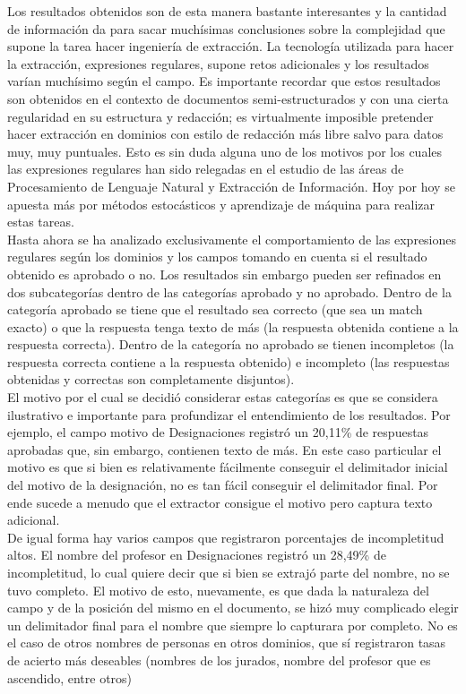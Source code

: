 Los resultados obtenidos son de esta manera bastante interesantes y la cantidad de información da para sacar muchísimas conclusiones sobre la complejidad que supone la tarea hacer ingeniería de extracción. La tecnología utilizada para hacer la extracción, expresiones regulares, supone retos adicionales y los resultados varían muchísimo según el campo. Es importante recordar que estos resultados son obtenidos en el contexto de documentos semi-estructurados y con una cierta regularidad en su estructura y redacción; es virtualmente imposible pretender hacer extracción en dominios con estilo de redacción más libre salvo para datos muy, muy puntuales. Esto es sin duda alguna uno de los motivos por los cuales las expresiones regulares han sido relegadas en el estudio de las áreas de Procesamiento de Lenguaje Natural y Extracción de Información. Hoy por hoy se apuesta más por métodos estocásticos y aprendizaje de máquina para realizar estas tareas. \\

Hasta ahora se ha analizado exclusivamente el comportamiento de las expresiones regulares según los dominios y los campos tomando en cuenta si el resultado obtenido es aprobado o no. Los resultados sin embargo pueden ser refinados en dos subcategorías dentro de las categorías aprobado y no aprobado. Dentro de la categoría aprobado se tiene que el resultado sea correcto (que sea un match exacto) o que la respuesta tenga texto de más (la respuesta obtenida contiene a la respuesta correcta). Dentro de la categoría no aprobado se tienen incompletos (la respuesta correcta contiene a la respuesta obtenido) e incompleto (las respuestas obtenidas y correctas son completamente disjuntos). \\

El motivo por el cual se decidió considerar estas categorías es que se considera ilustrativo e importante para profundizar el entendimiento de los resultados. Por ejemplo, el campo motivo de Designaciones registró un 20,11\% de respuestas aprobadas que, sin embargo, contienen texto de más. En este caso particular el motivo es que si bien es relativamente fácilmente conseguir el delimitador inicial del motivo de la designación, no es tan fácil conseguir el delimitador final. Por ende sucede a menudo que el extractor consigue el motivo pero captura texto adicional. \\

De igual forma hay varios campos que registraron porcentajes de incompletitud altos. El nombre del profesor en Designaciones registró un 28,49\% de incompletitud, lo cual quiere decir que si bien se extrajó parte del nombre, no se tuvo completo. El motivo de esto, nuevamente, es que dada la naturaleza del campo y de la posición del mismo en el documento, se hizó muy complicado elegir un delimitador final para el nombre que siempre lo capturara por completo. No es el caso de otros nombres de personas en otros dominios, que sí registraron tasas de acierto más deseables (nombres de los jurados, nombre del profesor que es ascendido, entre otros)\\

